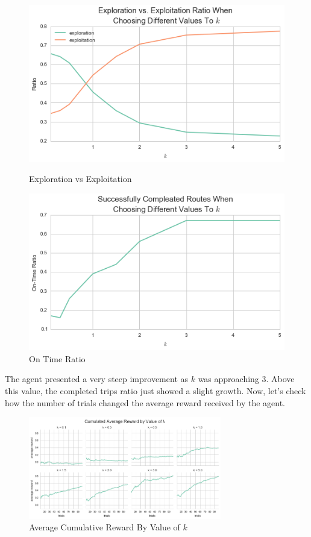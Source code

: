 \documentclass[a4paper]{article}
\begin{document}
\begin{figure}[ht!]
  \includegraphics[width=\linewidth]{images/exploint_explore.png}
  \caption{\label{fig:exploint_explore}Exploration vs Exploitation}
\endminipage
{}
  \includegraphics[width=\linewidth]{images/success_runs.png}
  \caption{\label{fig:success_runs}On Time Ratio}
\endminipage
\end{figure}

\newpage
The agent presented a very steep improvement as $k$ was approaching $3$. Above this value, the completed trips ratio just showed a slight growth. Now, let's check how the number of trials changed the average reward received by the agent.

\begin{figure}[ht!]
\centering
\includegraphics[width=0.75\textwidth]{images/cum_reward_by_k.png}
\caption{\label{fig:cum_reward_by_k}Average Cumulative Reward By Value of $k$}
\end{figure}
\end{document}
